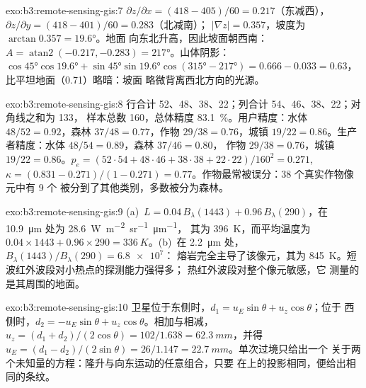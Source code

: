 \begin{solution}{exo:b3:remote-sensing-gis:7}
$\partial z/\partial x = (418 - 405)/60 = 0.217$（东减西），
$\partial z/\partial y = (418 - 401)/60 = 0.283$（北减南）；
$|\nabla z| = 0.357$，坡度为 $\arctan 0.357 = \ang{19.6}$。地面
向东北升高，因此坡面朝西南：$A =
\operatorname{atan2}(-0.217, -0.283) = \ang{217}$。山体阴影：$\cos\ang{45}
\cos\ang{19.6} + \sin\ang{45}\sin\ang{19.6}\cos(\ang{315} - \ang{217}) =
0.666 - 0.033 = 0.63$，比平坦地面（0.71）略暗：坡面
略微背离西北方向的光源。
\end{solution}

\begin{solution}{exo:b3:remote-sensing-gis:8}
行合计 52、48、38、22；列合计 54、46、38、22；对角线之和为 133，
样本总数 160，总体精度 \qty{83.1}{\percent}。用户精度：水体
$48/52 = 0.92$，森林 $37/48 = 0.77$，作物 $29/38 = 0.76$，城镇
$19/22 = 0.86$。生产者精度：水体 $48/54 = 0.89$，森林 $37/46 = 0.80$，
作物 $29/38 = 0.76$，城镇 $19/22 = 0.86$。$p_e = (52\cdot54 + 48\cdot46 +
38\cdot38 + 22\cdot22)/160^2 = 0.271$, $\kappa = (0.831 - 0.271)/(1 -
0.271) = 0.77$。作物最常被误分：38 个真实作物像元中有 9 个
被分到了其他类别，多数被分为森林。
\end{solution}

\begin{solution}{exo:b3:remote-sensing-gis:9}
(a)~$L = 0.04\,B_\lambda(1443) + 0.96\,B_\lambda(290)$，在
\qty{10.9}{\micro\metre} 处为 \qty{28.6}{W.m^{-2}.sr^{-1}.\micro\metre^{-1}}，
其为 \qty{396}{K}，而平均温度为
$0.04\times1443 + 0.96\times290 = \qty{336}{K}$。(b)~在
\qty{2.2}{\micro\metre} 处，$B_\lambda(1443)/B_\lambda(290) = \num{6.8e7}$：
熔岩完全主导了该像元，其为
\qty{845}{K}。短波红外波段对小热点的探测能力强得多；
热红外波段对整个像元敏感，它
测量的是其周围的地面。
\end{solution}

\begin{solution}{exo:b3:remote-sensing-gis:10}
卫星位于东侧时，$d_1 = u_E\sin\theta + u_z\cos\theta$；位于
西侧时，$d_2 = -u_E\sin\theta + u_z\cos\theta$。相加与相减，
$u_z = (d_1 + d_2)/(2\cos\theta) = 102/1.638 = \qty{62.3}{mm}$，并得 $u_E =
(d_1 - d_2)/(2\sin\theta) = 26/1.147 = \qty{22.7}{mm}$。单次过境只给出一个
关于两个未知量的方程：隆升与向东运动的任意组合，只要
在上的投影相同，便给出相同的条纹。
\end{solution}

